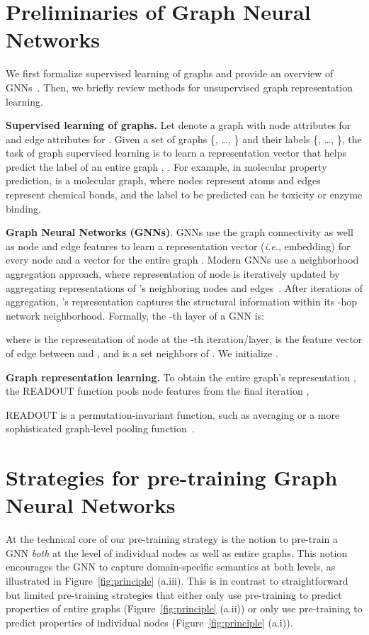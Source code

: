 \documentclass{article} \usepackage{iclr2020_conference,times}
\numberwithin{equation}{section}
\theoremstyle{plain}
\theoremstyle{definition}
\theoremstyle{remark}
\newcommand{\ie}{\textit{i.e.}}
\begin{document}
 \section{Preliminaries of Graph Neural Networks}
\label{sec:preliminaries}
We first formalize supervised learning of graphs and provide an overview of GNNs~\citep{gilmer2017neural}. Then, we briefly review methods for unsupervised graph representation learning.

{\bf Supervised learning of graphs.}
Let  denote a graph with node attributes  for  and edge attributes  for . Given a set of graphs \{, \ldots, \} and their labels \{, \ldots, \}, the task of graph supervised learning is to learn a representation vector  that helps predict the label of an entire graph , .
For example, in molecular property prediction,  is a molecular graph, where nodes represent atoms and edges represent chemical bonds, and the label to be predicted can be toxicity or enzyme binding.

{\bf Graph Neural Networks (GNNs)}.
GNNs use the graph connectivity as well as node and edge features to learn a representation vector (\ie, embedding)  for every node  and a vector  for the entire graph . 
Modern GNNs use a neighborhood aggregation approach, where representation of node  is iteratively updated by aggregating representations of 's neighboring nodes and edges~\citep{gilmer2017neural}. After  iterations of aggregation, 's representation captures the structural information within its -hop network neighborhood. Formally, the -th layer of a GNN is: 

where  is the representation of node  at the -th iteration/layer,  is the feature vector of edge between  and , and  is a set neighbors of . We initialize . 

{\bf Graph representation learning.}
To obtain the entire graph's representation , the READOUT function pools node features from the final iteration ,

READOUT is a permutation-invariant function, such as averaging or a more sophisticated graph-level pooling function~\citep{ying2018hierarchical,zhang2018end}.






 \section{Strategies for pre-training Graph Neural Networks}
\label{sec:strategy}

At the technical core of our pre-training strategy is the notion to pre-train a GNN  \emph{both} at the level of individual nodes as well as entire graphs. This notion encourages the GNN to capture domain-specific semantics at both levels, as illustrated in Figure~\ref{fig:principle} (a.iii).
This is in contrast to straightforward but limited pre-training strategies that either only use pre-training to predict properties of entire graphs (Figure~\ref{fig:principle} (a.ii)) or only use pre-training to predict properties of individual nodes (Figure~\ref{fig:principle} (a.i)).
\end{document}
